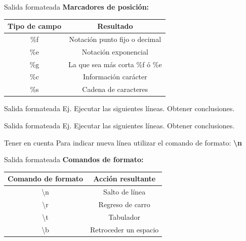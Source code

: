 \documentclass{bredelebeamer}
\begin{document}
\begin{frame}{Salida formateada}
\textbf{Marcadores de posición:}
\begin{table}[]
\centering
\begin{tabular}{|c|c|}
\hline
Tipo de campo & Resultado                      \\ \hline
\%f           & Notación punto fijo o decimal  \\ \hline
\%e           & Notación exponencial           \\ \hline
\%g           & La que sea más corta \%f ó \%e \\ \hline
\%c           & Información carácter           \\ \hline
\%s           & Cadena de caracteres           \\ \hline
\end{tabular}
\end{table}
\end{frame}

\begin{frame}{Salida formateada}
Ej. Ejecutar las siguientes líneas. Obtener conclusiones.
\end{frame}

\begin{frame}{Salida formateada}
Ej. Ejecutar las siguientes líneas. Obtener conclusiones.
\begin{block}{Tener en cuenta}
Para indicar nueva línea utilizar el comando de formato: \textbf{\textbackslash n}
\end{block}
\end{frame}

\begin{frame}{Salida formateada}
\textbf{Comandos de formato:}
\begin{table}[]
\centering
\begin{tabular}{|c|c|}
\hline
Comando de formato & Acción resultante     \\ \hline
\textbackslash{}n  & Salto de línea        \\ \hline
\textbackslash{}r  & Regreso de carro      \\ \hline
\textbackslash{}t  & Tabulador             \\ \hline
\textbackslash{}b  & Retroceder un espacio \\ \hline
\end{tabular}
\end{table}
\end{frame}
\end{document}
